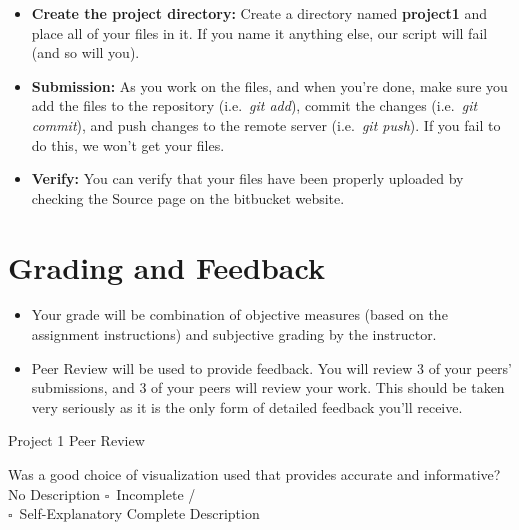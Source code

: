 \documentclass[a4paper,12pt]{article}
\begin{document}
\begin{itemize}
\item \textbf{Create the project directory:} Create a directory named \textbf{project1} and place all of your files in it. If you name it anything else, our script will fail (and so will you).

\item \textbf{Submission:} As you work on the files, and when you're done, make sure you add the files to the repository (i.e.\ \textit{git add}), commit the changes (i.e.\ \textit{git commit}), and push changes to the remote server (i.e.\ \textit{git push}). If you fail to do this, we won't get your files. 

\item \textbf{Verify:} You can verify that your files have been properly uploaded by checking the Source page on the bitbucket website.

\end{itemize}


\section{Grading and Feedback}

\begin{itemize}

\item Your grade will be combination of objective measures (based on the assignment instructions) and subjective grading by the instructor.

\item Peer Review will be used to provide feedback. You will review 3 of your peers' submissions, and 3 of your peers will review your work. This should be taken very seriously as it is the only form of detailed feedback you'll receive.

\end{itemize}






\newpage

\begin{center}
{\huge Project 1 Peer Review}
\end{center}




	{Was a good choice of visualization used that provides accurate and informative?}
	{\choice No Description}
	{$\square$~Incomplete /\\$\square$~Self-Explanatory}
	{\choice Complete Description}
\end{document}
